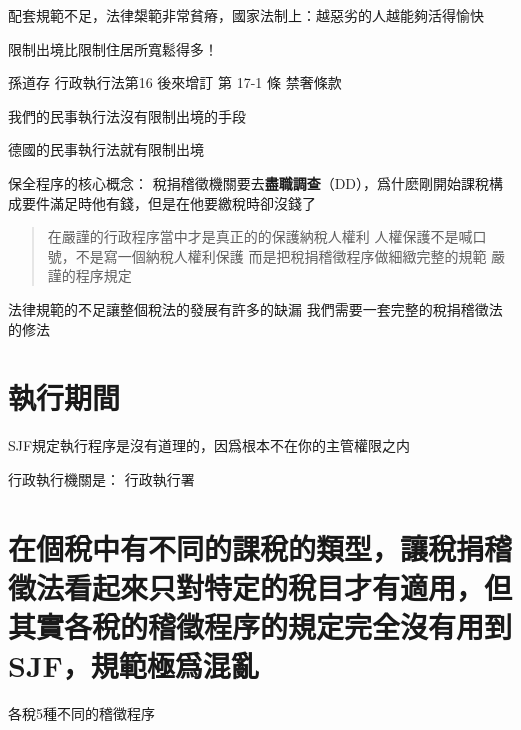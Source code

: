 \documentclass[]{ctexbook}
\begin{document}
配套規範不足，法律槼範非常貧瘠，國家法制上：越惡劣的人越能夠活得愉快

限制出境比限制住居所寬鬆得多！

孫道存
行政執行法第16
後來增訂
第 17-1 條 禁奢條款

我們的民事執行法沒有限制出境的手段

德國的民事執行法就有限制出境

保全程序的核心概念：
稅捐稽徵機關要去\textbf{盡職調查}（DD），爲什麽剛開始課稅構成要件滿足時他有錢，但是在他要繳稅時卻沒錢了

\begin{quote}
在嚴謹的行政程序當中才是真正的的保護納稅人權利
人權保護不是喊口號，不是寫一個納稅人權利保護
而是把稅捐稽徵程序做細緻完整的規範
嚴謹的程序規定
\end{quote}

法律規範的不足讓整個稅法的發展有許多的缺漏
我們需要一套完整的稅捐稽徵法的修法

\hypertarget{ux57f7ux884cux671fux9593}{%
\section{執行期間}\label{ux57f7ux884cux671fux9593}}

SJF規定執行程序是沒有道理的，因爲根本不在你的主管權限之内

行政執行機關是：
行政執行署

\hypertarget{ux5728ux500bux7a05ux4e2dux6709ux4e0dux540cux7684ux8ab2ux7a05ux7684ux985eux578bux8b93ux7a05ux6350ux7a3dux5fb5ux6cd5ux770bux8d77ux4f86ux53eaux5c0dux7279ux5b9aux7684ux7a05ux76eeux624dux6709ux9069ux7528ux4f46ux5176ux5be6ux5404ux7a05ux7684ux7a3dux5fb5ux7a0bux5e8fux7684ux898fux5b9aux5b8cux5168ux6c92ux6709ux7528ux5230sjfux898fux7bc4ux6975ux7232ux6df7ux4e82}{%
\section{在個稅中有不同的課稅的類型，讓稅捐稽徵法看起來只對特定的稅目才有適用，但其實各稅的稽徵程序的規定完全沒有用到SJF，規範極爲混亂}\label{ux5728ux500bux7a05ux4e2dux6709ux4e0dux540cux7684ux8ab2ux7a05ux7684ux985eux578bux8b93ux7a05ux6350ux7a3dux5fb5ux6cd5ux770bux8d77ux4f86ux53eaux5c0dux7279ux5b9aux7684ux7a05ux76eeux624dux6709ux9069ux7528ux4f46ux5176ux5be6ux5404ux7a05ux7684ux7a3dux5fb5ux7a0bux5e8fux7684ux898fux5b9aux5b8cux5168ux6c92ux6709ux7528ux5230sjfux898fux7bc4ux6975ux7232ux6df7ux4e82}}

各稅5種不同的稽徵程序



\backmatter
\printindex
\end{document}
